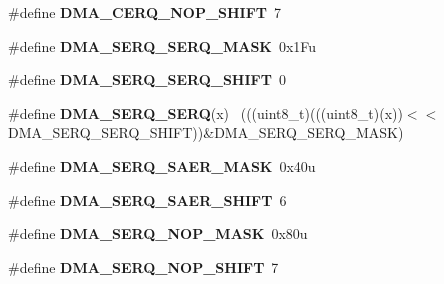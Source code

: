 \begin{DoxyCompactItemize}
\item 
\hypertarget{group___d_m_a___register___masks_ga68bc3b3f8e1fe22186c0e92e73a93c64}{}\#define {\bfseries D\+M\+A\+\_\+\+C\+E\+R\+Q\+\_\+\+N\+O\+P\+\_\+\+S\+H\+I\+F\+T}~7\label{group___d_m_a___register___masks_ga68bc3b3f8e1fe22186c0e92e73a93c64}

\item 
\hypertarget{group___d_m_a___register___masks_ga42b17276b88c86b34cabdbf64e4686c2}{}\#define {\bfseries D\+M\+A\+\_\+\+S\+E\+R\+Q\+\_\+\+S\+E\+R\+Q\+\_\+\+M\+A\+S\+K}~0x1\+Fu\label{group___d_m_a___register___masks_ga42b17276b88c86b34cabdbf64e4686c2}

\item 
\hypertarget{group___d_m_a___register___masks_ga41f7ac5f6e15267810208ea0146bdcad}{}\#define {\bfseries D\+M\+A\+\_\+\+S\+E\+R\+Q\+\_\+\+S\+E\+R\+Q\+\_\+\+S\+H\+I\+F\+T}~0\label{group___d_m_a___register___masks_ga41f7ac5f6e15267810208ea0146bdcad}

\item 
\hypertarget{group___d_m_a___register___masks_gad26753d68bb64c5584fdbe1c11d276db}{}\#define {\bfseries D\+M\+A\+\_\+\+S\+E\+R\+Q\+\_\+\+S\+E\+R\+Q}(x)                                              ~(((uint8\+\_\+t)(((uint8\+\_\+t)(x))$<$$<$D\+M\+A\+\_\+\+S\+E\+R\+Q\+\_\+\+S\+E\+R\+Q\+\_\+\+S\+H\+I\+F\+T))\&D\+M\+A\+\_\+\+S\+E\+R\+Q\+\_\+\+S\+E\+R\+Q\+\_\+\+M\+A\+S\+K)\label{group___d_m_a___register___masks_gad26753d68bb64c5584fdbe1c11d276db}

\item 
\hypertarget{group___d_m_a___register___masks_gad102371be9a2c3a971988f98297f85eb}{}\#define {\bfseries D\+M\+A\+\_\+\+S\+E\+R\+Q\+\_\+\+S\+A\+E\+R\+\_\+\+M\+A\+S\+K}~0x40u\label{group___d_m_a___register___masks_gad102371be9a2c3a971988f98297f85eb}

\item 
\hypertarget{group___d_m_a___register___masks_ga47c6cd05ecac5d87cdd944a6a3630571}{}\#define {\bfseries D\+M\+A\+\_\+\+S\+E\+R\+Q\+\_\+\+S\+A\+E\+R\+\_\+\+S\+H\+I\+F\+T}~6\label{group___d_m_a___register___masks_ga47c6cd05ecac5d87cdd944a6a3630571}

\item 
\hypertarget{group___d_m_a___register___masks_ga149895dd87ae0297478305fb26cc426e}{}\#define {\bfseries D\+M\+A\+\_\+\+S\+E\+R\+Q\+\_\+\+N\+O\+P\+\_\+\+M\+A\+S\+K}~0x80u\label{group___d_m_a___register___masks_ga149895dd87ae0297478305fb26cc426e}

\item 
\hypertarget{group___d_m_a___register___masks_ga2aef1400cca514fe504a0f23b53bea33}{}\#define {\bfseries D\+M\+A\+\_\+\+S\+E\+R\+Q\+\_\+\+N\+O\+P\+\_\+\+S\+H\+I\+F\+T}~7\label{group___d_m_a___register___masks_ga2aef1400cca514fe504a0f23b53bea33}


\end{DoxyCompactItemize}

